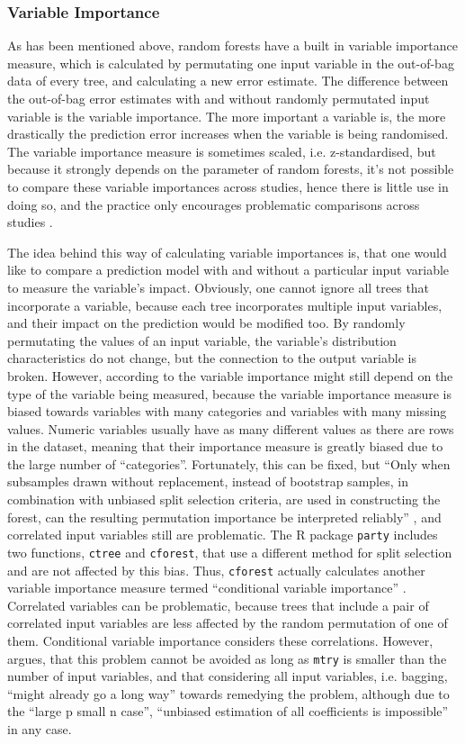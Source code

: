 \documentclass[a4paper,man,12pt,apacite,floatsintext,draftfirst]{apa6} %
\begin{document}
\subsubsection{Variable Importance}
As has been mentioned above, random forests have a built in variable
importance measure, which is calculated by permutating one input variable
in the out-of-bag data of every tree, and calculating a new error estimate.
The difference between the out-of-bag error estimates with and without
randomly permutated input variable is the variable importance.
The more important a variable is, the more drastically the prediction error
increases when the variable is being randomised.
The variable importance measure is sometimes scaled, i.e. z-standardised,
but because it strongly depends on the parameter of random forests,
it's not possible to compare these variable importances across studies,
hence there is little use in doing so, and the practice only encourages
problematic comparisons across studies \cite{strobl2009introduction}.

The idea behind this way of calculating variable importances is,
that one would like to compare a prediction model with and without a
particular input variable to measure the variable's impact.
Obviously, one cannot ignore all trees that incorporate a variable,
because each tree incorporates multiple input variables, and their impact
on the prediction would be modified too.
By randomly permutating the values of an input variable,
the variable's distribution characteristics do not change, but the connection to the
output variable is broken.
However, according to  the variable importance might
still depend on the type of the variable being measured, because the
variable importance measure is biased towards variables with many categories
and variables with many missing values.
Numeric variables usually have as many different values as there are rows
in the dataset, meaning that their importance measure is greatly biased due
to the large number of “categories”.
Fortunately, this can be fixed, but “Only when subsamples drawn without
replacement, instead of bootstrap samples, in combination with unbiased
split selection criteria, are used in constructing the forest, can the
resulting permutation importance be interpreted reliably”
\cite{strobl2007bias}, and correlated input variables still are
problematic.
The R package \texttt{party} includes two functions, \texttt{ctree} and
\texttt{cforest}, that use a different method for split selection and are not
affected by this bias.
Thus, \texttt{cforest} actually calculates another variable importance measure termed
“conditional variable importance” \cite{strobl2008conditional}.
Correlated variables can be problematic, because trees that include a
pair of correlated input variables are less affected by the random
permutation of one of them.
Conditional variable importance considers these correlations.
However,  argues, that this problem cannot be avoided
as long as \texttt{mtry} is smaller than the number of input variables,
and that considering all input variables, i.e. bagging,
“might already go a long way” towards remedying the problem,
although due to the “large p small n case”, “unbiased estimation of all
coefficients is impossible” in any case.
\end{document}
